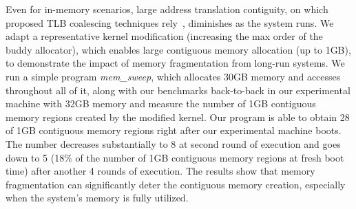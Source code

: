 Even for in-memory scenarios, large address translation contiguity, on which proposed
TLB coalescing techniques rely~\cite{haria:devirtualizing,karakostas:redundant,gantz:hybrid,pham:colt,pham:increasing}, diminishes as the system runs. We adapt a representative kernel modification (increasing the max order of the buddy allocator), which enables large contiguous memory allocation (up to 1GB), to demonstrate the impact of memory fragmentation from long-run systems. We run a simple program \textit{mem\_sweep}, which allocates 30GB memory and accesses throughout all of it, along with our benchmarks back-to-back in our experimental machine with 32GB memory and measure the number of 1GB contiguous memory regions created by the modified kernel. Our program is able to obtain 28 of 1GB contiguous memory regions right after our experimental machine boots. The number decreases substantially to 8 at second round of execution and goes down to 5 (18\% of the number of 1GB contiguous memory regions at fresh boot time) after another 4 rounds of execution. The results show that memory fragmentation can significantly deter the contiguous memory creation, especially when the system's memory is fully utilized.
